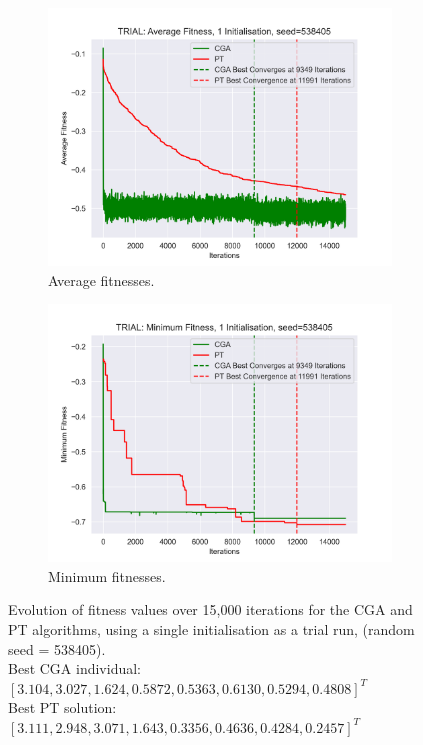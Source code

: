 \documentclass[10pt]{article}
\begin{document}
\begin{figure}[H]
    \centering
    \begin{subfigure}{0.48\textwidth}
        \includegraphics[width=\textwidth]{../figures/Final Comparison/CGA vs PT Average Fitness TRIAL.png}
        \caption{Average fitnesses.}
        \label{fig:AVG_trial_fitness}
    \end{subfigure}
    \begin{subfigure}{0.48\textwidth}
        \includegraphics[width=\textwidth]{../figures/Final Comparison/CGA vs PT Minimum Fitness TRIAL.png}
        \caption{Minimum fitnesses.}
        \label{fig:MIN_trial_fitness}
    \end{subfigure}
\captionsetup{justification=centering}
\caption{Evolution of fitness values over 15,000 iterations for the CGA and PT algorithms, using a single initialisation as a trial run, (random seed = 538405). \\Best CGA individual: $[3.104, 3.027, 1.624, 0.5872, 0.5363, 0.6130, 0.5294, 0.4808]^T$\\ Best PT solution: $[3.111, 2.948, 3.071, 1.643, 0.3356, 0.4636, 0.4284, 0.2457]^T$}
\label{fig:trial_fitness}
\end{figure}
\end{document}
